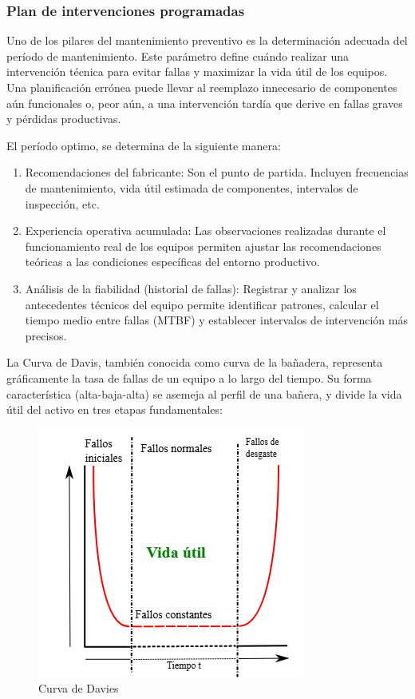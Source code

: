 \documentclass[a4paper,oneside,11pt]{article}
\begin{document}
\begin{enumerate}
    \subsubsection{Plan de intervenciones programadas}

    Uno de los pilares del mantenimiento preventivo es la determinación adecuada del período de mantenimiento. Este parámetro define cuándo realizar una intervención técnica para evitar fallas y maximizar la vida útil de los equipos. Una planificación errónea puede llevar al reemplazo innecesario de componentes aún funcionales o, peor aún, a una intervención tardía que derive en fallas graves y pérdidas productivas.

    El período optimo, se determina de la siguiente manera:
    \begin{enumerate}
        \item Recomendaciones del fabricante:
        Son el punto de partida. Incluyen frecuencias de mantenimiento, vida útil estimada de componentes, intervalos de inspección, etc.
        \item Experiencia operativa acumulada:
        Las observaciones realizadas durante el funcionamiento real de los equipos permiten ajustar las recomendaciones teóricas a las condiciones específicas del entorno productivo.
        \item Análisis de la fiabilidad (historial de fallas):
        Registrar y analizar los antecedentes técnicos del equipo permite identificar patrones, calcular el tiempo medio entre fallas (MTBF) y establecer intervalos de intervención más precisos.
    \end{enumerate}

    La Curva de Davis, también conocida como curva de la bañadera, representa gráficamente la tasa de fallas de un equipo a lo largo del tiempo. Su forma característica (alta-baja-alta) se asemeja al perfil de una bañera, y divide la vida útil del activo en tres etapas fundamentales:

    \begin{figure} [ht!]
        \centering
        \includegraphics[scale=.7]{davies.png}
        \caption{Curva de Davies}
    \end{figure}


\end{enumerate}
\end{document}
